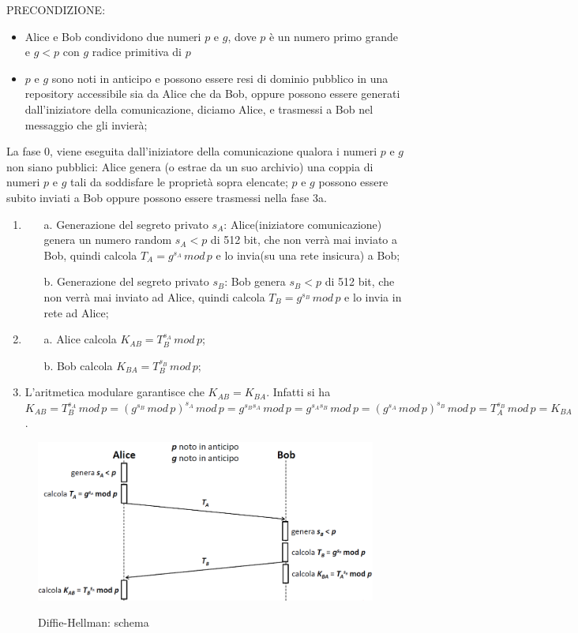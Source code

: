 PRECONDIZIONE: 
\begin{itemize}
\item Alice e Bob condividono due numeri $p$ e $g$, dove $p$ è un numero primo grande e $g<p$ con $g$ radice primitiva di $p$
\item $p$ e $g$ sono noti in anticipo e possono essere resi di dominio pubblico in una repository accessibile sia da Alice che da Bob, oppure possono essere generati dall'iniziatore della comunicazione,
diciamo Alice, e trasmessi a Bob nel messaggio che gli invierà;
\end{itemize}
La fase 0, viene eseguita dall'iniziatore della comunicazione qualora i numeri $p$ e $g$ non siano pubblici: Alice genera (o estrae da un suo archivio) una coppia di numeri $p$ e $g$ tali da soddisfare le proprietà sopra elencate; $p$ e $g$ possono essere subito inviati a Bob oppure possono essere trasmessi nella fase 3a.
\begin{enumerate}
\item \begin{enumerate}
\item [a.] Generazione del segreto privato $s_{A}$: Alice(iniziatore comunicazione) genera un numero random $s_{A}<p$ di 512 bit, che non verrà mai inviato a Bob, quindi calcola $T_{A}=g^{s_{A}} \, mod \,p$ e lo invia(su una rete insicura) a Bob;
\item [b.] Generazione del segreto privato $s_{B}$: Bob genera $s_{B}<p$ di 512 bit, che non verrà mai inviato ad Alice, quindi calcola $T_{B}=g^{s_{B}} \, mod \, p$ e lo invia in rete ad Alice;
\end{enumerate}
\item \begin{enumerate}
\item [a.] Alice calcola $K_{AB}=T_{B}^{s_{A}} \, mod \,p$;
\item [b.] Bob calcola $K_{BA}=T_{B}^{s_{B}} \, mod \, p$;
\end{enumerate}
\item L'aritmetica modulare garantisce che $K_{AB}=K_{BA}$. Infatti si ha $ K_{AB} = T_{B}^{s_{A}} \, mod \,p = ({g^{s_{B}} \, mod \, p})^{s_{A}} \, mod \,p = g^{s_{B}s_{A}} \, mod \, p = g^{s_{A}s_{B}} \, mod \, p = ({g^{s_{A}} \, mod \, p})^{s_{B}} \, mod \,p = T_{A}^{s_{B}} \, mod \, p = K_{BA}$.
\end{enumerate}
\begin{figure}[htbp]
	\centering%
	\subfigure%
	{\includegraphics[scale=0.5, keepaspectratio]{Immagini/chiave_pubblica/DiffieHellman_schema.png}}
	\caption{Diffie-Hellman: schema}
	\end{figure}

